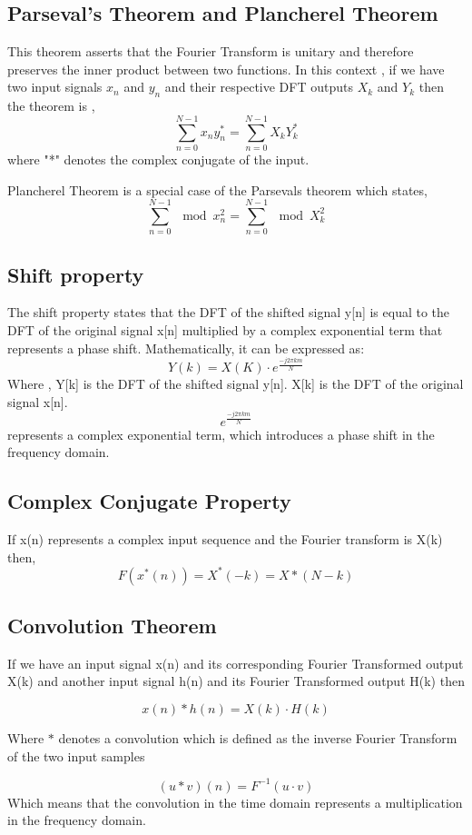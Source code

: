 \documentclass[11pt]{amsart}
\theoremstyle{definition}
\theoremstyle{remark}
\numberwithin{equation}{section}
\begin{document}
\subsection{Parseval's Theorem and Plancherel Theorem}
This theorem asserts that the Fourier Transform is unitary and therefore preserves the inner product between two functions. In this context , if we have two input signals $x_n$ and $y_n$ and their respective DFT outputs $X_k$ and $Y_k$ then the theorem is , 
\[\sum_{n = 0}^{N-1} x_n y_n^{*} = \sum_{n=0}^{N-1} X_k Y_k^{*}\]
where "*" denotes the complex conjugate of the input.

Plancherel Theorem is a special case of the Parsevals theorem which states,
\[\sum_{n = 0}^{N-1} \mod{ x_n^2} = \sum_{n=0}^{N-1} \mod{ X_k^2}\]

\subsection{Shift property}
The shift property states that the DFT of the shifted signal y[n] is equal to the DFT of the original signal x[n] multiplied by a complex exponential term that represents a phase shift. Mathematically, it can be expressed as:
\[Y(k) = X(K) \cdot e^{\frac{-j2 \pi k m}{N}}\]
Where , 
Y[k] is the DFT of the shifted signal y[n].
X[k] is the DFT of the original signal x[n].
\[e^{\frac{-j 2 \pi km}{N}}\] represents a complex exponential term, which introduces a phase shift in the frequency domain.

\subsection{Complex Conjugate Property}
If x(n) represents a complex input sequence  and the Fourier transform is X(k) then, 
\[\textit{F}(x^{*}(n)) = X^{*}(-k) = X*(N-k)\]

\subsection{Convolution Theorem}
If we have an input signal x(n) and its corresponding Fourier Transformed output X(k) and another input signal h(n) and its Fourier Transformed output H(k) then

\[x(n) \ast h(n)  = X(k) \cdot H(k)\]

Where $\ast$ denotes a convolution which is defined as the inverse Fourier Transform of the two input samples 

\[(u \ast v)(n) = \textit{F}^{-1} (u \cdot v)\]
Which means that the convolution in the time domain represents a multiplication in the frequency domain.
\end{document}
